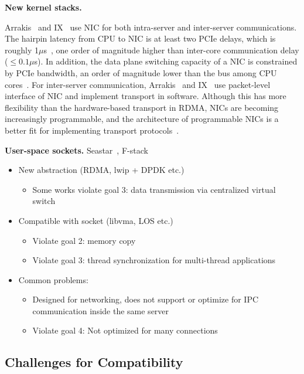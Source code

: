 \textbf{New kernel stacks.}



Arrakis~\cite{peter2016arrakis} and IX~\cite{belay2017ix} use NIC for both intra-server and inter-server communications. The hairpin latency from CPU to NIC is at least two PCIe delays, which is roughly 1$\mu$s~\cite{kaminsky2016design}, one order of magnitude higher than inter-core communication delay ($\leq0.1\mu$s). In addition, the data plane switching capacity of a NIC is constrained by PCIe bandwidth, an order of magnitude lower than the bus among CPU cores~\cite{li2017kv}. For inter-server communication, Arrakis~\cite{peter2016arrakis} and IX~\cite{belay2017ix} use packet-level interface of NIC and implement transport in software. Although this has more flexibility than the hardware-based transport in RDMA, NICs are becoming increasingly programmable, and the architecture of programmable NICs is a better fit for implementing transport protocols~\cite{kaufmann2015flexnic,smartnic,mellanox,cavium}. 

\textbf{User-space sockets.}
Seastar~\cite{seastar}, F-stack~\cite{fstack}


\begin{itemize}
\item New abstraction (RDMA, lwip + DPDK etc.) 
\begin{itemize}
	\item Some works violate goal 3: data transmission via centralized virtual switch 
\end{itemize}
\item Compatible with socket (libvma, LOS etc.) 
\begin{itemize}
	\item Violate goal 2: memory copy 
	\item Violate goal 3: thread synchronization for multi-thread applications 
\end{itemize}
\item Common problems: 
\begin{itemize}
	\item Designed for networking, does not support or optimize for IPC communication inside the same server 
	\item Violate goal 4: Not optimized for many connections 
\end{itemize}
\end{itemize}



\subsection{Challenges for Compatibility}
\label{subsec:challenges}

